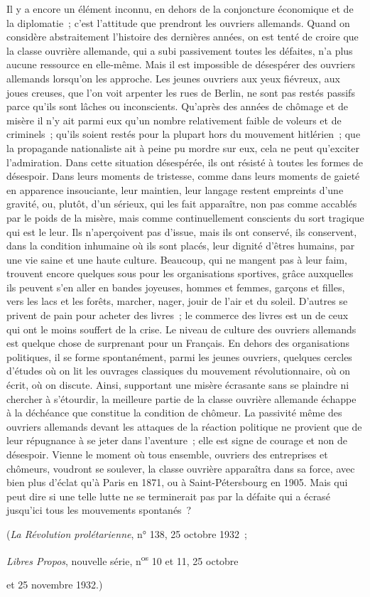 \documentclass[french,twoside]{book} %
\begin{document}
Il y a encore un élément inconnu, en dehors de la conjoncture économique et de la diplomatie ; c'est l'attitude que prendront les ouvriers allemands. Quand on considère abstraitement l'histoire des dernières années, on est tenté de croire que la classe ouvrière allemande, qui a subi passivement toutes les défaites, n'a plus aucune ressource en elle-même. Mais il est impossible de désespérer des ouvriers allemands lorsqu'on les approche. Les jeunes ouvriers aux yeux fiévreux, aux joues creuses, que l'on voit arpenter les rues de Berlin, ne sont pas restés passifs parce qu'ils sont lâches ou inconscients. Qu'après des années de chômage et de misère il n'y ait parmi eux qu'un nombre relative­ment faible de voleurs et de criminels ; qu'ils soient restés pour la plupart hors du mouvement hitlérien ; que la propagande nationaliste ait à peine pu mordre sur eux, cela ne peut qu'exciter l'admiration. Dans cette situation désespérée, ils ont résisté à toutes les formes de désespoir. Dans leurs moments de tristesse, comme dans leurs moments de gaieté en apparence insouciante, leur maintien, leur langage restent empreints d'une gravité, ou, plutôt, d'un sérieux, qui les fait apparaître, non pas comme accablés par le poids de la misère, mais comme continuellement conscients du sort tragique qui est le leur. Ils n'aperçoivent pas d'issue, mais ils ont conservé, ils conservent, dans la condi­tion inhumaine où ils sont placés, leur dignité d'êtres humains, par une vie saine et une haute culture. Beaucoup, qui ne mangent pas à leur faim, trouvent encore quelques sous pour les organisations sportives, grâce auxquelles ils peuvent s'en aller en bandes joyeuses, hommes et femmes, garçons et filles, vers les lacs et les forêts, marcher, nager, jouir de l'air et du soleil. D'autres se privent de pain pour acheter des livres ; le commerce des livres est un de ceux qui ont le moins souffert de la crise. Le niveau de culture des ouvriers allemands est quelque chose de surprenant pour un Français. En dehors des organisations politiques, il se forme spontanément, parmi les jeunes ouvriers, quelques cercles d'études où on lit les ouvrages classiques du mouvement révolutionnaire, où on écrit, où on discute. Ainsi, supportant une misère écrasante sans se plaindre ni chercher à s'étourdir, la meilleure partie de la classe ouvrière allemande échappe à la déchéance que constitue la condition de chômeur. La passivité même des ouvriers allemands devant les attaques de la réaction politique ne provient que de leur répugnance à se jeter dans l'aventure ; elle est signe de courage et non de désespoir. Vienne le moment où tous ensemble, ouvriers des entreprises et chômeurs, voudront se soulever, la classe ouvrière apparaîtra dans sa force, avec bien plus d'éclat qu'à Paris en 1871, ou à Saint-Pétersbourg en 1905. Mais qui peut dire si une telle lutte ne se terminerait pas par la défaite qui a écrasé jusqu'ici tous les mouvements spontanés ?\par
({\itshape La Révolution prolétarienne}, n° 138, 25 octobre 1932 ;\par
{\itshape Libres Propos}, nouvelle série, n\textsuperscript{os} 10 et 11, 25 octobre\par
et 25 novembre 1932.)\par
\end{document}
